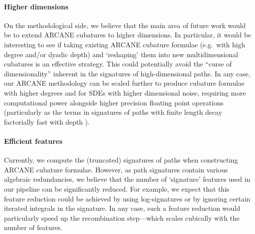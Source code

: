 \documentclass[11pt, letterpaper]{article}
\theoremstyle{definition}
\theoremstyle{remark}
\begin{document}
\paragraph{Higher dimensions} On the methodological side, we believe that the main area of future work would be to extend ARCANE cubatures to higher dimensions. In particular, it would be interesting to see if taking existing ARCANE cubature formulae (e.g.~with high degree and/or dyadic depth) and `reshaping' them into new multidimensional cubatures is an effective strategy. This could potentially avoid the ``curse of dimensionality'' inherent in the signatures of high-dimensional paths. In any case, our ARCANE methodology can be scaled further to produce cubature formulae with higher degrees and for SDEs with higher dimensional noise, requiring more computational power alongside higher precision floating point operations (particularly as the terms in signatures of paths with finite length decay factorially fast with depth \cite[Proposition 2.2]{terrystflour}).

\paragraph{Efficient features} Currently, we compute the (truncated) signatures of paths when constructing ARCANE cubature formulae. However, as path signatures contain various algebraic redundancies, we believe that the number of ‘signature’ features used in our pipeline can be significantly reduced. For example, we expect that this feature reduction could be achieved by using log-signatures or by ignoring certain iterated integrals in the signature. In any case, such a feature reduction would particularly speed up the recombination step---which scales cubically with the number of features.
\end{document}
